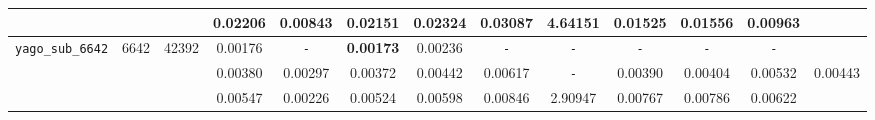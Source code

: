 \begin{table}
{\begin{tabular}{ l c c | c c c c c c c c c || c }
 &  &  & 0.02206 & 0.00843 & 0.02151 & 0.02324 & 0.03087 & 4.64151 & 0.01525 & 0.01556 & 0.00963 & \\
\hline
\verb|yago_sub_6642| & 6642 & 42392 & 0.00176 & \verb|-| & \textbf{0.00173} & 0.00236 & \verb|-| & \verb|-| & \verb|-| & \verb|-| & \verb|-| & \\
 &  &  & 0.00380 & 0.00297 & 0.00372 & 0.00442 & 0.00617 & \verb|-| & 0.00390 & 0.00404 & 0.00532 & 0.00443 \\
 &  &  & 0.00547 & 0.00226 & 0.00524 & 0.00598 & 0.00846 & 2.90947 & 0.00767 & 0.00786 & 0.00622 & \\
\hline
  \end{tabular}
}
\end{table}

\begin{table}
\hspace{-2cm}
\end{table}
